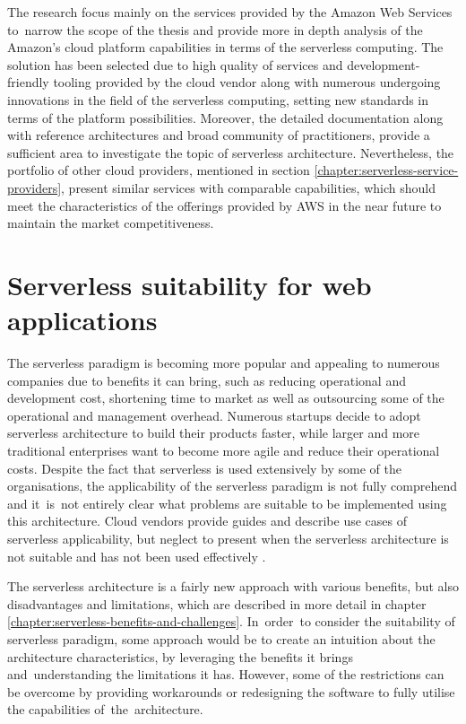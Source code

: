 The research focus mainly on the services provided by the Amazon Web Services to~narrow the scope of the thesis and provide more in depth analysis of the Amazon's cloud platform capabilities in terms of the serverless computing.
The solution has been selected due to high quality of services and development-friendly tooling provided by the cloud vendor along with numerous undergoing innovations in the field of the serverless computing, setting new standards in terms of the platform possibilities.
Moreover, the detailed documentation along with reference architectures and broad community of practitioners, provide a sufficient area to investigate the topic of serverless architecture.
Nevertheless, the portfolio of other cloud providers, mentioned in section \ref{chapter:serverless-service-providers}, present similar services with comparable capabilities, which should meet the characteristics of the offerings provided by AWS in the near future to maintain the market competitiveness.

\newpage

\section{Serverless suitability for web applications} \label{chapter:serverless-suitability}

The serverless paradigm is becoming more popular and appealing to numerous companies due to benefits it can bring, such as reducing operational and development cost, shortening time to market as well as outsourcing some of the operational and management overhead.
Numerous startups decide to adopt serverless architecture to build their products faster, while larger and more traditional enterprises want to become more agile and reduce their operational costs.
Despite the fact that serverless is used extensively by some of the organisations, the applicability of the serverless paradigm is not fully comprehend and it~is~not entirely clear what problems are suitable to be implemented using this architecture.
Cloud vendors provide guides and describe use cases of serverless applicability, but neglect to present when the serverless architecture is not suitable and has not been used effectively \cite{EvaluationOfServerlessApplicationProgrammingModel}.

The serverless architecture is a fairly new approach with various benefits, but also disadvantages and limitations, which are described in more detail in chapter \ref{chapter:serverless-benefits-and-challenges}.
In~order~to consider the suitability of serverless paradigm, some approach would be to create an intuition about the architecture characteristics, by leveraging the benefits it brings and~understanding the limitations it has.
However, some of the restrictions can be overcome by providing workarounds or redesigning the software to fully utilise the capabilities of~the~architecture.

